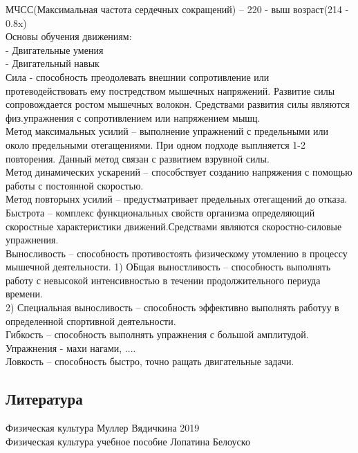 \documentclass[a4paper, 12pt]{article}
\begin{document}
МЧСС(Максимальная частота сердечных сокращений) -- 220 - выш возраст(214 - 0.8x)\\

Основы обучения движениям:\\
- Двигательные умения\\
- Двигательный навык\\


Сила - способность преодолевать внешнии сопротивление или протеводействовать ему постредством мышечных напряжений. Развитие силы сопровождается ростом мышечных волокон. Средствами развития силы являются физ.упражнения с сопротивлением или напряжением мышц.\\
Метод максимальных усилий -- выполнение упражнений с предельными или около предельными отегащениями. При одном подходе выплняется 1-2 повторения. Данный метод связан с развитием взрувной силы.\\
Метод динамических ускарений -- способствует созданию напряжения с помощью работы с постоянной скоростью.\\
Метод повторынх усилий -- предустматривает предельных отегащений до отказа.\\

Быстрота -- комплекс функциональных свойств организма определяющий скоростные характеристики движений.Средствами являются скоростно-силовые упражнения.\\

Выносливость -- способность противостоять физическому утомлению в процессу мышечной деятельности. 
1) ОБщая выностливость -- способность выполнять работу с невысокой интенсивностью в течении продолжительного периуда времени.\\
2) Специальная выносливость -- способность эффективно выполнять работуу в определенной спортивной деятельности.\\

Гибкость -- способность выполнять упражнения с большой амплитудой.\\
Упражнения - махи нагами, ....\\

Ловкость -- способность быстро, точно ращать двигательные задачи.\\











\newpage
\subsection*{Литература} 
Физическая культура Муллер Вядичкина 2019\\
Физическая культура учебное пособие Лопатина Белоуско \\ 
\end{document}
